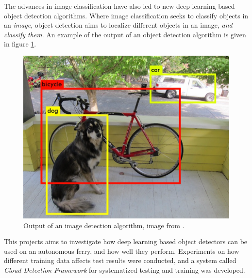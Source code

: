 \vspace{3mm}

The advances in image classification have also led to new deep learning based object detection algorithms. Where image classification seeks to classify objects in an \textit{image}, object detection aims to localize different objects in an image, \textit{and classify them}. An example of the output of an object detection algorithm is given in figure \ref{fig:imdet}. 

\begin{figure}[h!]
\centering
\includegraphics[scale=0.3]{images/imdet.png}
\caption{Output of an image detection algorithm, image from \citep{YOLOv1}.}
\label{fig:imdet}
\end{figure}




This projects aims to investigate how deep learning based object detectors can be used on an autonomous ferry, and how well they perform. Experiments on how different training data affects test results were conducted, and a system called \textit{Cloud Detection Framework} for systematized testing and training was developed.


\cleardoublepage